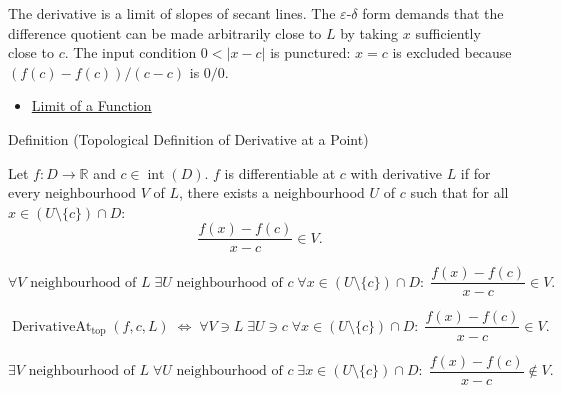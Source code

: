 \begin{remark*}[Interpretation]
The derivative is a limit of slopes of secant lines. The $\varepsilon$-$\delta$ form demands that the difference quotient can be made arbitrarily close to $L$ by taking $x$ sufficiently close to $c$. The input condition $0 < |x-c|$ is punctured: $x = c$ is excluded because $(f(c)-f(c))/(c-c)$ is $0/0$.
\end{remark*}

\begin{dependencies}
\begin{itemize}
  \item \hyperref[def:limit-function]{Limit of a Function}
\end{itemize}
\end{dependencies}


\begin{definitionbox}{Definition (Topological Definition of Derivative at a Point)}
\begin{definition}
\label{def:topological-definition-of-derivative-at-a-point}
Let $f: D \to \mathbb{R}$ and $c \in \operatorname{int}(D)$. $f$ is differentiable at $c$ with derivative $L$ if for every neighbourhood $V$ of $L$, there exists a neighbourhood $U$ of $c$ such that for all $x \in (U \setminus \{c\}) \cap D$:
\[
\frac{f(x) - f(c)}{x - c} \in V.
\]
\end{definition}
\end{definitionbox}

\begin{remark*}
\[
\forall V \text{ neighbourhood of } L\;\exists U \text{ neighbourhood of } c\;
\forall x \in (U \setminus \{c\}) \cap D:\;
\frac{f(x)-f(c)}{x-c} \in V.
\]
\end{remark*}

\begin{remark*}
\[
\operatorname{DerivativeAt}_{\mathrm{top}}(f,c,L)
\;\Longleftrightarrow\;
\forall V \ni L\;\exists U \ni c\;\forall x \in (U\setminus\{c\})\cap D:\;
\frac{f(x)-f(c)}{x-c}\in V.
\]
\end{remark*}

\begin{remark*}
\[
\exists V \text{ neighbourhood of } L\;\forall U \text{ neighbourhood of } c\;
\exists x \in (U \setminus \{c\}) \cap D:\;
\frac{f(x)-f(c)}{x-c} \notin V.
\]
\end{remark*}

